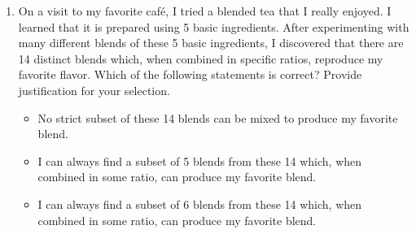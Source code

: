 \documentclass[11pt]{article}
\begin{document}
\begin{enumerate}
\begin{enumerate}
\end{enumerate}


\item On a visit to my favorite café, I tried a blended tea that I really enjoyed. I learned that it is prepared using 5 basic ingredients. After experimenting with many different blends of these 5 basic ingredients, I discovered that there are 14 distinct blends which, when combined in specific ratios, reproduce my favorite flavor.
Which of the following statements is correct? Provide justification for your selection.
\begin{itemize}
\item No strict subset of these 14 blends can be mixed to produce my favorite blend.
\item I can always find a subset of 5 blends from these 14 which, when combined in some ratio, can produce my favorite blend.
\item I can always find a subset of 6 blends from these 14 which, when combined in some ratio, can produce my favorite blend.
\end{itemize}



\end{enumerate}
\end{document}
